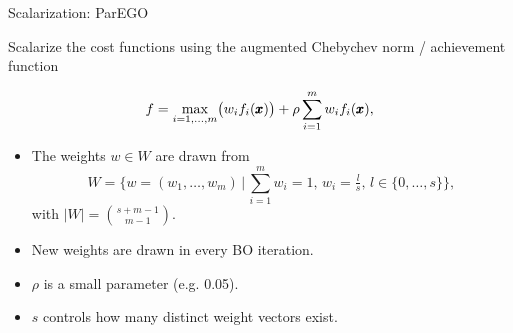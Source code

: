\documentclass[11pt,compress,t,notes=noshow,xcolor=table]{beamer}
\begin{document}
\begin{vbframe}{Scalarization: ParEGO~}

Scalarize the cost functions using the augmented Chebychev norm / achievement function

\[
f = \max_{i=1,\dots,m}\bigl(w_i f_i(\pmb{x})\bigr) 
    + \rho \sum_{i=1}^m w_i f_i(\pmb{x}),
\]

\begin{itemize}
  \item The weights $w \in W$ are drawn from
    \[
      W = 
        \bigl\{ w = (w_1, \dots, w_m) \,\big|\,
                \sum_{i=1}^m w_i = 1,\, w_i = \tfrac{l}{s},\, l \in \{0,\dots,s\}
        \bigr\},
    \]
    with $\lvert W \rvert = \binom{s+m-1}{m-1}$.
  \item New weights are drawn in every BO iteration.
  \item $\rho$ is a small parameter (e.g. 0.05).
  \item $s$ controls how many distinct weight vectors exist.
\end{itemize}

\end{vbframe}
\end{document}
